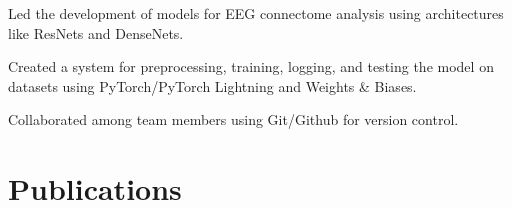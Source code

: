 \documentclass[]{deedy-resume-openfont}
\begin{document}
\begin{minipage}[t]{0.66\textwidth}
\begin{tightemize}
    \item Led the development of models for EEG connectome analysis using architectures like ResNets and DenseNets.
    \item Created a system for preprocessing, training, logging, and testing the model on datasets using PyTorch/PyTorch Lightning and Weights \& Biases.
    \item Collaborated among team members using Git/Github for version control.
\end{tightemize}
\sectionsep




\section{Publications}

\renewcommand\refname{\vskip -1.5em} %


\nocite{*}

\end{minipage} 
\end{document}
